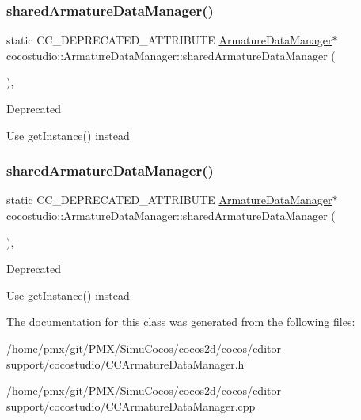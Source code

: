 \subsubsection{\texorpdfstring{shared\+Armature\+Data\+Manager()}{sharedArmatureDataManager()}\hspace{0.1cm}{\footnotesize\ttfamily [1/2]}}
{\footnotesize\ttfamily static C\+C\+\_\+\+D\+E\+P\+R\+E\+C\+A\+T\+E\+D\+\_\+\+A\+T\+T\+R\+I\+B\+U\+TE \hyperlink{classcocostudio_1_1ArmatureDataManager}{Armature\+Data\+Manager}$\ast$ cocostudio\+::\+Armature\+Data\+Manager\+::shared\+Armature\+Data\+Manager (\begin{DoxyParamCaption}{ }\end{DoxyParamCaption})\hspace{0.3cm}{\ttfamily [inline]}, {\ttfamily [static]}}

\begin{DoxyRefDesc}{Deprecated}
\item[\hyperlink{deprecated__deprecated000077}{Deprecated}]Use get\+Instance() instead \end{DoxyRefDesc}
\mbox{\label{classcocostudio_1_1ArmatureDataManager_a5f7ba0ce48d07b1aba63a2786c641607}} 
\subsubsection{\texorpdfstring{shared\+Armature\+Data\+Manager()}{sharedArmatureDataManager()}\hspace{0.1cm}{\footnotesize\ttfamily [2/2]}}
{\footnotesize\ttfamily static C\+C\+\_\+\+D\+E\+P\+R\+E\+C\+A\+T\+E\+D\+\_\+\+A\+T\+T\+R\+I\+B\+U\+TE \hyperlink{classcocostudio_1_1ArmatureDataManager}{Armature\+Data\+Manager}$\ast$ cocostudio\+::\+Armature\+Data\+Manager\+::shared\+Armature\+Data\+Manager (\begin{DoxyParamCaption}{ }\end{DoxyParamCaption})\hspace{0.3cm}{\ttfamily [inline]}, {\ttfamily [static]}}

\begin{DoxyRefDesc}{Deprecated}
\item[\hyperlink{deprecated__deprecated000312}{Deprecated}]Use get\+Instance() instead \end{DoxyRefDesc}


The documentation for this class was generated from the following files\+:\begin{DoxyCompactItemize}
\item 
/home/pmx/git/\+P\+M\+X/\+Simu\+Cocos/cocos2d/cocos/editor-\/support/cocostudio/C\+C\+Armature\+Data\+Manager.\+h\item 
/home/pmx/git/\+P\+M\+X/\+Simu\+Cocos/cocos2d/cocos/editor-\/support/cocostudio/C\+C\+Armature\+Data\+Manager.\+cpp\end{DoxyCompactItemize}
